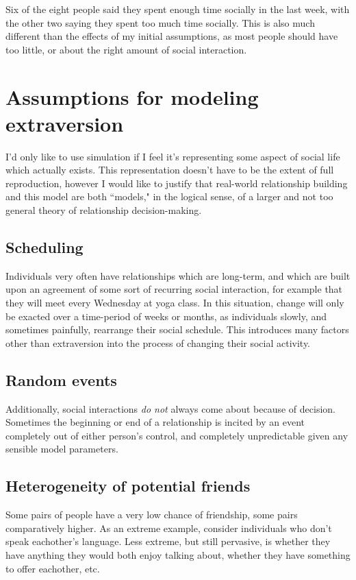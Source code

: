 \documentclass[]{article}
\begin{document}
	Six of the eight people said they spent enough time socially in the last week, with the other two saying they spent too much time socially.
	This is also much different than the effects of my initial assumptions, as most people should have too little, or about the right amount of social interaction.
	
	\section{Assumptions for modeling extraversion}
	I'd only like to use simulation if I feel it's representing some aspect of social life which actually exists. This representation doesn't have to be the extent of full reproduction, however I would like to justify that real-world relationship building and this model are both ``models," in the logical sense, of a larger and not too general theory of relationship decision-making.
	
	\subsection{Scheduling}
	Individuals very often have relationships which are long-term, and which are built upon an agreement of some sort of recurring social interaction, for example that they will meet every Wednesday at yoga class. In this situation, change will only be exacted over a time-period of weeks or months, as individuals slowly, and sometimes painfully, rearrange their social schedule. This introduces many factors other than extraversion into the process of changing their social activity.
	
	\subsection{Random events}
	Additionally, social interactions \textit{do not} always come about because of decision. Sometimes the beginning or end of a relationship is incited by an event completely out of either person's control, and completely unpredictable given any sensible model parameters. 
	
	\subsection{Heterogeneity of potential friends}
	Some pairs of people have a very low chance of friendship, some pairs comparatively higher.
	As an extreme example, consider individuals who don't speak eachother's language.
	Less extreme, but still pervasive, is whether they have anything they would both enjoy talking about, whether they have something to offer eachother, etc.
	
\end{document}
